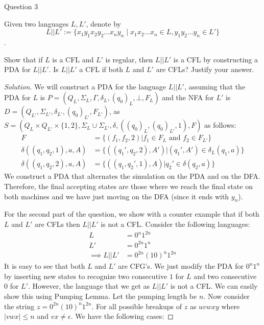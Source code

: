 \begin{solution}{Question 3}\label{ques:3}
    \begin{question}
      Given two languages $L, L'$, denote by $$L||L' := \{x_1y_1x_2y_2 \dots x_ny_n \mid x_1x_2 \dots x_n \in L, y_1y_2\dots y_n \in L'\}$$.\par
      Show that if $L$ is a CFL and $L'$ is regular, then $L || L'$ is a CFL by constructing a PDA for $L || L'$. Is $L || L'$ a CFL if both $L$ and $L'$ are CFLs? Justify your answer.
    \end{question}
    \tcblower{}
    \begin{proof}[Solution]
      We will construct a PDA for the language $L||L'$, assuming that the PDA for $L$ is $P = (Q_L, \Sigma_L, \Gamma, \delta_L, (q_0)_L, \bot, F_L)$ and the NFA for $L'$ is $D = (Q_{L'}, \Sigma_{L'}, \delta_{L'}, (q_0)_{L'}, F_{L'})$, as $S = (Q_L \times Q_{L'} \times \{1, 2\}, \Sigma_L \cup \Sigma_{L'}, \delta, ((q_0)_L, (q_0)_{L'}, 1), F)$ as follows:
      \begin{equation}
        \begin{split}
          F &= \{(f_1, f_2, 2) | f_1 \in F_L\text{ and }f_2 \in F_{L'}\}\\
          \delta((q_1, q_2, 1), a, A) &= \{((q_1', q_2, 2), A') | (q_1', A') \in \delta_L(q_1, a)\}\\
          \delta((q_1, q_2, 2), a, A) &= \{((q_1, q_2', 1), A) | q_2' \in \delta(q_2, a)\}
        \end{split}
      \end{equation}
      We construct a PDA that alternates the simulation on the PDA and on the DFA. Therefore, the final accepting states are those where we reach the final state on both machines and we have just moving on the DFA (since it ends with $y_n$).\par
      For the second part of the question, we show with a counter example that if both $L$ and $L'$ are CFLs then $L || L'$ is not a CFL. Consider the following languages:
      \begin{equation}
        \begin{split}
          L &= 0^n1^{2n}\\
          L' &= 0^{2n}1^n\\
          \implies L || L' &= 0^{2n}(10)^n1^{2n}
        \end{split}
      \end{equation}
      It is easy to see that both $L$ and $L'$ are CFG's. We just modify the PDA for $0^n1^n$ by inserting new states to recognize two consecutive $1$ for $L$ and two consecutive $0$ for $L'$. However, the language that we get as $L || L'$ is not a CFL. We can easily show this using Pumping Lemma. Let the pumping length be $n$. Now consider the string $z = 0^{2n}(10)^n1^{2n}$. For all possible breakups of $z$ as $uvwxy$ where $|vwx| \leq n$ and $vx \neq \epsilon$. We have the following cases:

\end{proof}
\end{solution}
